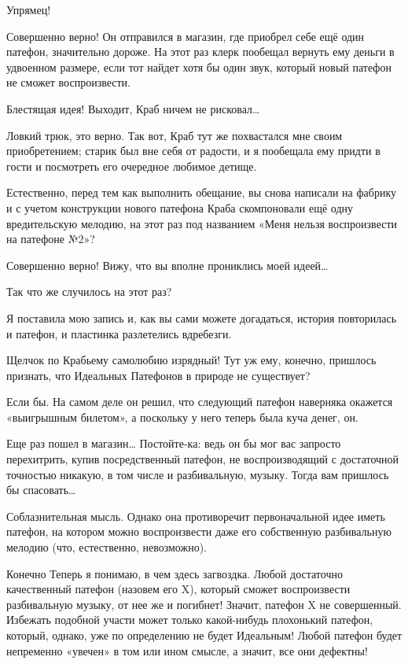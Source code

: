 \documentclass[../main.tex]{subfiles}
\begin{document}
\begin{Dialogue}
 Упрямец!

 Совершенно верно! Он отправился в магазин, где приобрел себе ещё один патефон, значительно дороже. На этот раз клерк пообещал вернуть ему деньги в удвоенном размере, если тот найдет хотя бы один звук, который новый патефон не сможет воспроизвести.

 {\Large Б}лестящая идея! Выходит, Краб ничем не рисковал\ldots{}

 Ловкий трюк, это верно. Так вот, Краб тут же похвастался мне своим приобретением; старик был вне себя от радости, и я пообещала ему придти в гости и посмотреть его очередное любимое детище.

 Естественно, перед тем как выполнить обещание, вы снова написали на фабрику и с учетом конструкции нового патефона Краба скомпоновали ещё одну вредительскую мелодию, на этот раз под названием «Меня нельзя воспроизвести на патефоне №2»?

 Совершенно верно! Вижу, что вы вполне прониклись моей идеей\ldots{}

 Так что же случилось на этот раз?

 Я поставила мою запись и, как вы сами можете догадаться, история повторилась и патефон, и пластинка разлетелись вдребезги.

 Щелчок по Крабьему самолюбию изрядный! Тут уж ему, конечно, пришлось признать, что Идеальных Патефонов в природе не существует?

 Если бы. На самом деле он решил, что следующий патефон наверняка окажется «выигрышным билетом», а поскольку у него теперь была куча денег, он.

 Еще раз пошел в магазин\ldots{} Постойте-ка: ведь он бы мог вас запросто перехитрить, купив посредственный патефон, не воспроизводящий с достаточной точностью никакую, в том числе и разбивальную, музыку. Тогда вам пришлось бы спасовать\ldots{}

 Соблазнительная мысль. Однако она противоречит первоначальной идее иметь патефон, на котором можно воспроизвести даже его собственную разбивальную мелодию (что, естественно, невозможно).

 Конечно Теперь я понимаю, в чем здесь загвоздка. Любой достаточно качественный патефон (назовем его X), который сможет воспроизвести разбивальную музыку, от нее же и погибнет! Значит, патефон X не совершенный. Избежать подобной участи может только какой-нибудь плохонький патефон, который, однако, уже по определению не будет Идеальным! Любой патефон будет непременно «увечен» в том или ином смысле, а значит, все они дефектны!


\end{Dialogue}
\end{document}

